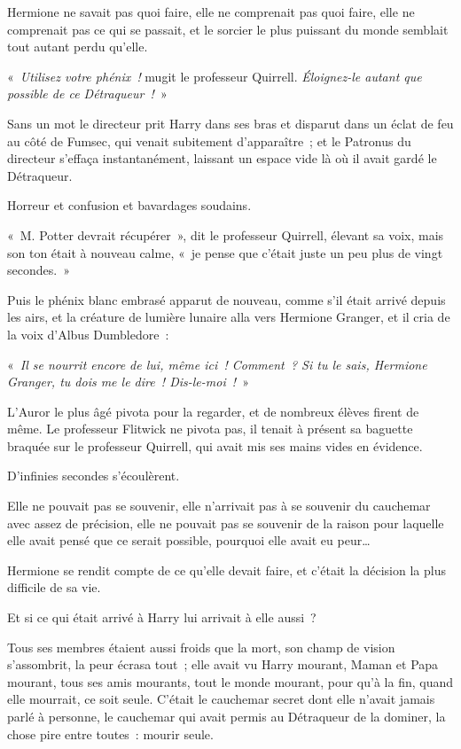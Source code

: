 Hermione ne savait pas quoi faire, elle ne comprenait pas quoi faire, elle ne comprenait pas ce qui se passait, et le sorcier le plus puissant du monde semblait tout autant perdu qu'elle.

«~\emph{Utilisez votre phénix~!} mugit le professeur Quirrell. \emph{Éloignez-le autant que possible de ce Détraqueur~!}~»

Sans un mot le directeur prit Harry dans ses bras et disparut dans un éclat de feu au côté de Fumsec, qui venait subitement d'apparaître~; et le Patronus du directeur s'effaça instantanément, laissant un espace vide là où il avait gardé le Détraqueur.

Horreur et confusion et bavardages soudains.

«~M. Potter devrait récupérer~», dit le professeur Quirrell, élevant sa voix, mais son ton était à nouveau calme, «~je pense que c'était juste un peu plus de vingt secondes.~»

Puis le phénix blanc embrasé apparut de nouveau, comme s'il était arrivé depuis les airs, et la créature de lumière lunaire alla vers Hermione Granger, et il cria de la voix d'Albus Dumbledore~:

«~\emph{Il se nourrit encore de lui, même ici~! Comment~? Si tu le sais, Hermione Granger, tu dois me le dire~! Dis-le-moi~!}~»

L'Auror le plus âgé pivota pour la regarder, et de nombreux élèves firent de même. Le professeur Flitwick ne pivota pas, il tenait à présent sa baguette braquée sur le professeur Quirrell, qui avait mis ses mains vides en évidence.

D'infinies secondes s'écoulèrent.

Elle ne pouvait pas se souvenir, elle n'arrivait pas à se souvenir du cauchemar avec assez de précision, elle ne pouvait pas se souvenir de la raison pour laquelle elle avait pensé que ce serait possible, pourquoi elle avait eu peur…

Hermione se rendit compte de ce qu'elle devait faire, et c'était la décision la plus difficile de sa vie.

Et si ce qui était arrivé à Harry lui arrivait à elle aussi~?

Tous ses membres étaient aussi froids que la mort, son champ de vision s'assombrit, la peur écrasa tout~; elle avait vu Harry mourant, Maman et Papa mourant, tous ses amis mourants, tout le monde mourant, pour qu'à la fin, quand elle mourrait, ce soit seule. C'était le cauchemar secret dont elle n'avait jamais parlé à personne, le cauchemar qui avait permis au Détraqueur de la dominer, la chose pire entre toutes~: mourir seule.

